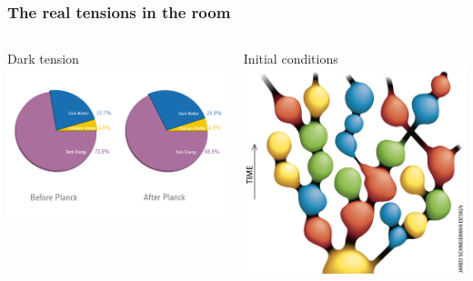\documentclass[aspectratio=169]{beamer}
\begin{document}
\begin{frame}
    \frametitle{The real tensions in the room}


    \begin{columns}
        \begin{block}{Dark tension}
            \includegraphics[width=\textwidth]{figures/pie_chart.jpg}
        \end{block}
        \begin{block}{Initial conditions}
            \includegraphics[width=\textwidth]{figures/multiverse.jpg}

\end{block}
\end{columns}
\end{frame}
\end{document}
